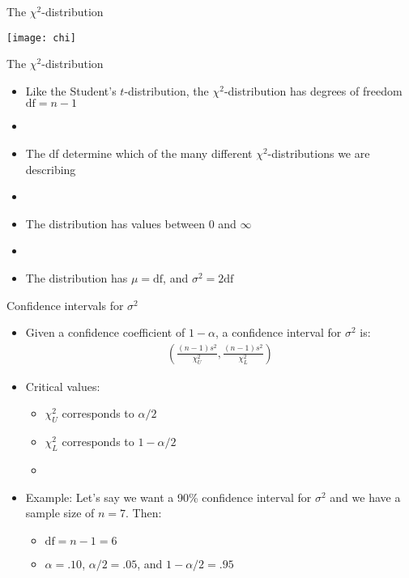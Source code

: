 \documentclass[xcolor=dvipsnames]{beamer}
\begin{document}
\begin{frame}{The  $\chi^2$-distribution}
	\begin{center}
		\texttt{[image: chi]}
	\end{center}
\end{frame}

\begin{frame}{The  $\chi^2$-distribution }
	\begin{itemize}
		\item Like the Student's $t$-distribution, the $\chi^2$-distribution has degrees of freedom $\text{df}=n-1$
		\item[]
		\item The df determine which of the many different $\chi^2$-distributions we are describing
		\item[]
		\item The distribution has values between $0$ and $\infty$
		\item[]
		\item The distribution has $\mu = \text{df}$, and $\sigma^2 = 2\text{df}$
	\end{itemize}
\end{frame}

\begin{frame}{Confidence intervals for $\sigma^2$}
	\begin{itemize}
		\item Given a confidence coefficient of $1-\alpha$, a confidence interval for $\sigma^2$ is:
		\begin{gather*}
		\left(\frac{(n-1) s^2}{\chi_U^2}, \frac{(n-1)s^2}{\chi_L^2} \right)
		\end{gather*}
		\item Critical values:
		\begin{itemize}
			\item $\chi^2_U$ corresponds to $\alpha / 2$
			\item $\chi^2_L$ corresponds to $1 - \alpha / 2$
			\item[]
		\end{itemize}
	\item Example: Let's say we want a 90\% confidence interval for $\sigma^2$ and we have a sample size of $n = 7$. Then:
	\begin{itemize}
		\item  $\text{df} = n-1 = 6$
		\item $\alpha = .10$, $\alpha / 2 = .05$, and $1-\alpha / 2 = .95$
	\end{itemize}
	\end{itemize}
\end{frame}
\end{document}
